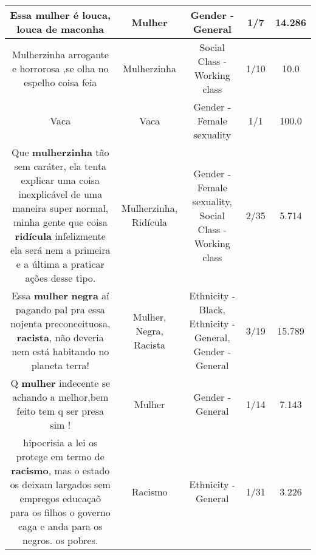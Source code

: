 \documentclass[11pt]{article}
\newlength\mylength
\begin{document}
\begin{center}
\begin{longtable}{|C{.65\mylength}|C{.30\mylength}|C{.12\mylength}|C{.12\mylength}|C{.12\mylength}|}
  \small Essa \textbf{mulher} é louca, louca de maconha\normalsize   & Mulher & Gender - General & 1/7 & 14.286 \\  \hline
  \small Mulherzinha arrogante e horrorosa ,se olha no espelho coisa feia\normalsize   & Mulherzinha & Social Class - Working class & 1/10 & 10.0 \\  \hline
  \small Vaca\normalsize   & Vaca & Gender - Female sexuality & 1/1 & 100.0 \\  \hline
  \small Que \textbf{mulherzinha} tão sem caráter, ela tenta explicar uma coisa inexplicável de uma maneira super normal, minha gente que coisa \textbf{ridícula} infelizmente ela será nem a primeira e a última a praticar ações desse tipo.\normalsize   & Mulherzinha, Ridícula & Gender - Female sexuality, Social Class - Working class & 2/35 & 5.714 \\  \hline
  \small Essa \textbf{mulher} \textbf{negra} aí pagando pal pra essa nojenta preconceituosa, \textbf{racista}, não deveria nem está habitando no planeta terra!\normalsize   & Mulher, Negra, Racista & Ethnicity - Black, Ethnicity - General, Gender - General & 3/19 & 15.789 \\  \hline
  \small Q \textbf{mulher} indecente se achando a melhor,bem feito tem q ser presa sim !\normalsize   & Mulher & Gender - General & 1/14 & 7.143 \\  \hline
  \small hipocrisia a lei os protege  em termo de \textbf{racismo}, mas o estado os deixam largados sem empregos educaçaõ para os filhos o governo caga e anda para os negros. os pobres.\normalsize   & Racismo & Ethnicity - General & 1/31 & 3.226 \\  \hline

\end{longtable}
\end{center}
\end{document}
